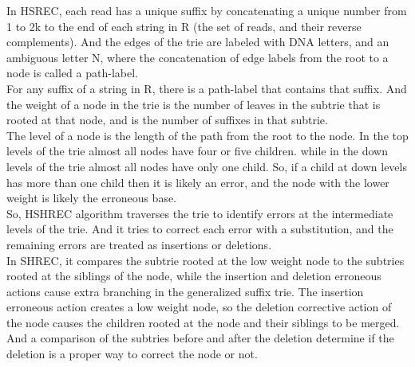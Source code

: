 \documentclass[12pt]{llncs}
\begin{document}
In HSREC, each read has a unique suffix by concatenating a unique number from 1 to 2k to the end of each string in R (the set of reads, and their reverse complements). And the edges of the trie are labeled with DNA letters, and an ambiguous letter N, where the concatenation of edge labels from the root to a node is called a path-label. 
\\
For any suffix of a string in R, there is a path-label that contains that suffix. And the weight of a node in the trie is the number of leaves in the subtrie that is rooted at that node, and is the number of suffixes in that subtrie. 
\\
The level of a node is the length of the path from the root to the node. In the top levels of the trie almost all nodes have four or five children. while in the down levels of the trie almost all nodes have only one child. So, if a child at down levels has more than one child then it is likely an error, and the node with the lower weight is likely the erroneous base. 
\\
So, HSHREC algorithm traverses the trie to identify errors at the intermediate levels of the trie. And it tries to correct each error with a substitution, and the remaining errors are treated as insertions or deletions.
\\
In SHREC, it compares the subtrie rooted at the low weight node to the subtries rooted at the siblings of the node, while the insertion and deletion erroneous actions cause extra branching in the generalized suffix trie. The insertion erroneous action creates a low weight node, so the deletion corrective action of the node causes the children rooted at the node and their siblings to be merged. And a comparison of the subtries before and after the deletion determine if the deletion is a proper way to correct the node or not. 
\end{document}
